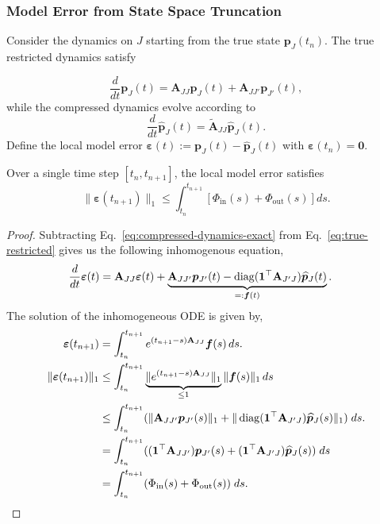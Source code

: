 \documentclass[review,onefignum,onetabnum]{siamart171218}
\begin{document}
\subsubsection{Model Error from State Space Truncation}

Consider the dynamics on $J$ starting from the true state $\boldsymbol{p}_J(t_n)$. The true restricted dynamics satisfy

\begin{equation}
\label{eq:true-restricted}
\frac{d}{dt} \boldsymbol{p}_J(t) = \mathbf{A}_{JJ}\boldsymbol{p}_J(t) + \mathbf{A}_{JJ'}\boldsymbol{p}_{J'}(t),
\end{equation}
while the compressed dynamics evolve according to
\begin{equation}
\label{eq:compressed-dynamics-exact}
\frac{d}{dt} \widehat{\boldsymbol{p}}_J(t) = \widetilde{\mathbf{A}}_{JJ}\widehat{\boldsymbol{p}}_J(t).
\end{equation}
Define the local model error $\boldsymbol{\varepsilon}(t) := \boldsymbol{p}_J(t) - \widehat{\boldsymbol{p}}_J(t)$ with $\boldsymbol{\varepsilon}(t_n) = \mathbf{0}$.

\begin{theorem}
\label{thm:local-model-error}
Over a single time step $[t_n, t_{n+1}]$, the local model error satisfies
\begin{equation}
\|\boldsymbol{\varepsilon}(t_{n+1})\|_1 \leq \int_{t_n}^{t_{n+1}} \left[\Phi_{\mathrm{in}}(s) + \Phi_{\mathrm{out}}(s)\right] ds.
\end{equation}
\end{theorem}

\begin{proof}
Subtracting Eq.~\eqref{eq:compressed-dynamics-exact} from Eq.~\eqref{eq:true-restricted} gives us the following inhomogenous equation,
\begin{align*}
\frac{d}{dt}\boldsymbol{\varepsilon}(t) &= \mathbf{A}_{JJ}\boldsymbol{\varepsilon}(t) + \underbrace{\mathbf{A}_{JJ'}\boldsymbol{p}_{J'}(t) - \operatorname{diag}(\mathbf{1}^\top\mathbf{A}_{J'J})\widehat{\boldsymbol{p}}_J(t)}_{=: \boldsymbol{f}(t)}.
\end{align*}
The solution of the inhomogeneous ODE is given by,
\begin{align}
\boldsymbol{\varepsilon}(t_{n+1}) &= \int_{t_n}^{t_{n+1}} e^{(t_{n+1}-s)\mathbf{A}_{JJ}}\boldsymbol{f}(s) \, ds. \\
\|\boldsymbol{\varepsilon}(t_{n+1})\|_1 &\leq \int_{t_n}^{t_{n+1}} \underbrace{\|e^{(t_{n+1}-s)\mathbf{A}_{JJ}}\|_{1}}_{\leq 1 }\|\boldsymbol{f}(s)\|_1 \, ds \\
&\leq \int_{t_n}^{t_{n+1}} (\|\mathbf{A}_{JJ'}\boldsymbol{p}_{J'}(s)\|_1  + \|\operatorname{diag}(\mathbf{1}^\top\mathbf{A}_{J'J})\widehat{\boldsymbol{p}}_J(s)\|_1)  \; ds. \\
&= \int_{t_n}^{t_{n+1}} ( (\mathbf{1}^\top \mathbf{A}_{JJ'})\boldsymbol{p}_{J'}(s) + (\mathbf{1}^\top\mathbf{A}_{J'J})\widehat{\boldsymbol{p}}_J(s)) \;ds \\
&= \int_{t_n}^{t_{n+1}} (\Phi_{\mathrm{in}}(s) + \Phi_{\mathrm{out}}(s)) \; ds.
\end{align}

\end{proof}
\end{document}
